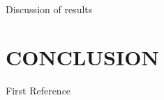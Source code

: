 \documentclass[letterpaper, 10 pt, conference]{ieeeconf}  %
\begin{document}
Discussion of results 

\section{CONCLUSION}

\addtolength{\textheight}{-12cm}   %










\begin{thebibliography}{99}

 First Reference 

\end{thebibliography}
\end{document}
